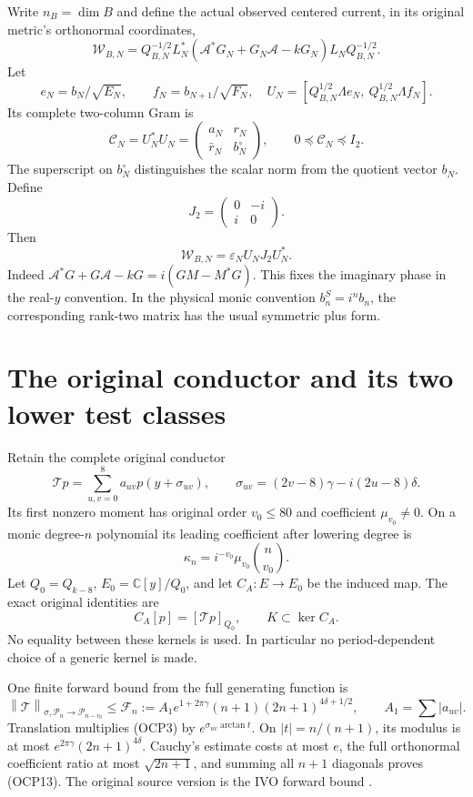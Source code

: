 \documentclass[11pt]{article}
\newcommand{\C}{\mathbb C}
\newcommand{\Pp}{\mathcal P}
\newcommand{\eps}{\varepsilon}
\newcommand{\norm}[1]{\left\lVert#1\right\rVert}
\begin{document}
Write $n_B=\dim B$ and define the actual observed centered current, in its original metric's orthonormal coordinates,
\[
 \mathscr W_{B,N}=Q_{B,N}^{-1/2}L_N^*
 (\mathscr A^*G_N+G_N\mathscr A-kG_N)
 L_NQ_{B,N}^{-1/2}.
 \tag{OCP8}
\]
Let
\[
 e_N=b_N/\sqrt{E_N},\qquad f_N=b_{N+1}/\sqrt{F_N},
 \quad U_N=[Q_{B,N}^{1/2}\Lambda e_N,\ Q_{B,N}^{1/2}\Lambda f_N].
\]
Its complete two-column Gram is
\[
 \mathcal C_N=U_N^*U_N=
 \begin{pmatrix}a_N&r_N\\\bar r_N&b_N^{\circ}\end{pmatrix},
 \qquad 0\preceq\mathcal C_N\preceq I_2.
 \tag{OCP9}
\]
The superscript on $b_N^{\circ}$ distinguishes the scalar norm from the quotient vector $b_N$. Define
\[
 J_2=\begin{pmatrix}0&-i\\i&0\end{pmatrix}.
\]
Then
\[
 \mathscr W_{B,N}=\eps_NU_NJ_2U_N^*.
 \tag{OCP10}
\]
Indeed $\mathscr A^*G+G\mathscr A-kG=i(GM-M^*G)$. This fixes the imaginary phase in the real-$y$ convention. In the physical monic convention $b_n^S=i^nb_n$, the corresponding rank-two matrix has the usual symmetric plus form.

\section{The original conductor and its two lower test classes}
Retain the complete original conductor
\[
 \mathcal Tp=\sum_{u,v=0}^8a_{uv}p(y+\sigma_{uv}),\qquad
 \sigma_{uv}=(2v-8)\gamma-i(2u-8)\delta.
\]
Its first nonzero moment has original order $v_0\le80$ and coefficient $\mu_{v_0}\ne0$. On a monic degree-$n$ polynomial its leading coefficient after lowering degree is
\[
 \kappa_n=i^{-v_0}\mu_{v_0}\binom n{v_0}.
 \tag{OCP11}
\]
Let $Q_0=Q_{k-8}$, $E_0=\C[y]/Q_0$, and let $C_A:E\to E_0$ be the induced map. The exact original identities are
\[
 C_A[p]=[\mathcal Tp]_{Q_0},\qquad K\subset\ker C_A.
 \tag{OCP12}
\]
No equality between these kernels is used. In particular no period-dependent choice of a generic kernel is made.

One finite forward bound from the full generating function is
\[
 \norm{\mathcal T}_{\sigma,\Pp_n\to\Pp_{n-v_0}}
 \le\mathcal F_n:=A_1e^{1+2\pi\gamma}(n+1)(2n+1)^{4\delta+1/2},
 \qquad A_1=\sum|a_{uv}|.
 \tag{OCP13}
\]
Translation multiplies (OCP3) by $e^{\sigma_{uv}\arctan t}$. On $|t|=n/(n+1)$, its modulus is at most $e^{2\pi\gamma}(2n+1)^{4\delta}$. Cauchy's estimate costs at most $e$, the full orthonormal coefficient ratio at most $\sqrt{2n+1}$, and summing all $n+1$ diagonals proves (OCP13). The original source version is the IVO forward bound \cite{ivo}.
\end{document}
